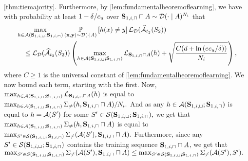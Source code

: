 \begin{proofof}{\cref{thm:tiemajority}.}
Furthermore, by \cref{lem:fundamentalheoremoflearning}, we have with probability at least $ 1-\delta/c_{u} $ over $ \mathbf{S}_{1,i,\sqcap}\sqcap A\sim \mathcal{D}(\cdot\mid A)^{N_{i}} $ that
\begin{align}\label{eq:secondmajority4}
& \max_{h\in \mathcal{A}(\mathbf{S}_{1,i,\sqcup};\mathbf{S}_{1,i,\sqcap})}\operatorname*{\mathbb{P}}_{(\mathbf{x},\mathbf{y})\sim \mathcal{D}(\cdot\mid A)}\left[h(x)\not=y\right]\operatorname{\mathcal{L}}_{\mathcal{D}}(\widehat{\mathcal{A}}_{t_{2}}(S_{2})) \nonumber \\
& \quad \leq \operatorname{\mathcal{L}}_{\mathcal{D}}(\widehat{\mathcal{A}}_{t_{2}}(S_{2}))\left(\max_{h\in \mathcal{A}(\mathbf{S}_{1,i,\sqcup};\mathbf{S}_{1,i,\sqcap})}\operatorname{\mathcal{L}}_{\mathbf{S}_{1,i,\sqcap}\sqcap A}(h)+\sqrt{\frac{C(d+\ln{\left(ec_{u}/\delta \right)})}{N_{i}}}\right),
\end{align}
where  $ C\geq1 $ is the universal constant of \cref{lem:fundamentalheoremoflearning}.   
We now bound each term, starting with the first. 
Now, $ \max_{h\in \mathcal{A}(\mathbf{S}_{1,i,\sqcup};\mathbf{S}_{1,i,\sqcap})}\operatorname{\mathcal{L}}_{\mathbf{S}_{1,i,\sqcap}\sqcap A}(h) $ is equal to $ \max_{h\in \mathcal{A}(\mathbf{S}_{1,i,\sqcup};\mathbf{S}_{1,i,\sqcap})} \Sigma_{\not=}(h,\mathbf{S}_{1,i,\sqcap}\sqcap A)/N_{i}.$ 
And as any $ h\in \mathcal{A}(\mathbf{S}_{1,i,\sqcup};\mathbf{S}_{1,i,\sqcap}) $ is equal to $ h=\mathcal{A}(S') $ for some $ S'\in \mathcal{S}(\mathbf{S}_{1,i,\sqcup};\mathbf{S}_{1,i,\sqcap}),$ we get that $ \max_{h\in \mathcal{A}(\mathbf{S}_{1,i,\sqcup};\mathbf{S}_{1,i,\sqcap})} \Sigma_{\not=}(h,\mathbf{S}_{1,i,\sqcap}\sqcap A)$ is equal to $ \max_{S'\in \mathcal{S}(\mathbf{S}_{1,i,\sqcup};\mathbf{S}_{1,i,\sqcap})} \Sigma_{\not=}(\mathcal{A}(S'),\mathbf{S}_{1,i,\sqcap}\sqcap A).$ 
Furthermore, since any $ S'\in \mathcal{S}(\mathbf{S}_{1,i,\sqcup};\mathbf{S}_{1,i,\sqcap}) $ contains the training sequence $ \mathbf{S}_{1,i,\sqcap} \sqcap A$, we get that 
$ \max_{S'\in \mathcal{S}(\mathbf{S}_{1,i,\sqcup};\mathbf{S}_{1,i,\sqcap})} \Sigma_{\not=}(\mathcal{A}(S'),\mathbf{S}_{1,i,\sqcap}\sqcap A) \leq  \max_{S'\in \mathcal{S}(\mathbf{S}_{1,i,\sqcup};\mathbf{S}_{1,i,\sqcap})} \Sigma_{\not=}(\mathcal{A}(S'),S').$


\end{proofof}
